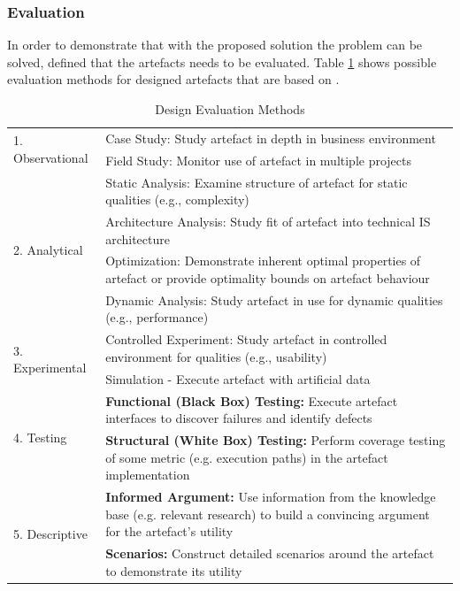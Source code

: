 
\subsubsection{Evaluation}

In order to demonstrate that with the proposed solution the problem can be solved, \cite{Hevner2010}  defined that the artefacts needs to be evaluated.
Table \ref{tbl:designevaluationmethods} shows possible evaluation methods for designed artefacts that are based on \cite{Hevner2004}.
\begin{table}[h]
	\begin{center}
		\begin{tabular}{ | m{4cm} | p{10cm} | } 
			\hline
			\multirow{2}{*}{1. Observational} &
				Case Study: Study artefact in depth in business environment \\
				\cline{2-2}
				& Field Study: Monitor use of artefact in multiple projects \\
			\hline
			\multirow{4}{*}{2. Analytical} &
				Static Analysis: Examine structure of artefact for static qualities (e.g., complexity) \\
				\cline{2-2}
				& Architecture Analysis: Study fit of artefact into technical IS architecture \\
				\cline{2-2}
				& Optimization: Demonstrate inherent optimal properties of artefact or provide optimality bounds on artefact behaviour \\
				\cline{2-2}
				& Dynamic Analysis: Study artefact in use for dynamic qualities (e.g., performance) \\
			\hline
			\multirow{2}{*}{3. Experimental} &
				Controlled Experiment: Study artefact in controlled environment for qualities (e.g., usability) \\
				\cline{2-2}
				& Simulation - Execute artefact with artificial data \\
			\hline
			\multirow{2}{*}{4. Testing} &
				\cellcolor{green!25}\textbf{Functional (Black Box) Testing:} Execute artefact interfaces to discover failures and identify defects \\
				\hhline{|~|-|}
				& \cellcolor{green!25}\textbf{Structural (White Box) Testing:} Perform coverage testing of some metric (e.g. execution paths) in the artefact implementation \\
			\hline
			\multirow{2}{*}{5. Descriptive} &
				\cellcolor{green!25}\textbf{Informed Argument:} Use information from the knowledge base (e.g. relevant research) to build a convincing argument for the artefact's utility \\
				\hhline{|~|-|}
				& \cellcolor{green!25}\textbf{Scenarios:} Construct detailed scenarios around the artefact to demonstrate its utility \\
			\hline
		\end{tabular}
		\caption[Design Evaluation Methods]{Design Evaluation Methods \citep[based on][]{Hevner2004}}
		\label{tbl:designevaluationmethods}
	\end{center}
\end{table} \newline

